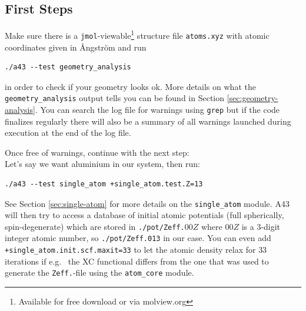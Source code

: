 \documentclass[oribibl]{llncs}
\newcommand{\ttt}[1]{\texttt{#1}}
\newcommand{\codename}{A43}
\begin{document}
\subsection{First Steps} \label{sec:first-steps}
%
Make sure there is a \ttt{jmol}-viewable\footnote{Available for free download or via molview.org} structure file \ttt{atoms.xyz}
with atomic coordinates given in \AA{}ngstr\"{o}m and run
\begin{verbatim}
./a43 --test geometry_analysis
\end{verbatim}
in order to check if your geometry looks ok.
More details on what the \ttt{geometry\_analysis} output tells you can be found in Section \ref{sec:geometry-analysis}.
You can search the log file for warnings using \ttt{grep} but
if the code finalizes regularly
there will also be a summary of all warnings launched during execution at the end of the log file.
%

\noindent
Once free of warnings, continue with the next step:\\
Let's say we want aluminium in our system, then run:
\begin{verbatim}
./a43 --test single_atom +single_atom.test.Z=13
\end{verbatim}
See Section \ref{sec:single-atom} for more details on the \ttt{single\_atom} module.
%
\noindent
\codename{} will then try to access a database of initial atomic potentials
(full spherically, spin-degenerate) which are stored in \ttt{./pot/Zeff.}$00Z$
where $00Z$ is a 3-digit integer atomic number, so \ttt{./pot/Zeff.013} in our case.
You can even add \ttt{+single\_atom.init.scf.maxit=33} to let the atomic density relax for $33$ iterations
if e.g.~ the \ac{XC} functional differs from the one that was used to generate the \ttt{Zeff.}-file using the \ttt{atom\_core} module.
\end{document}

